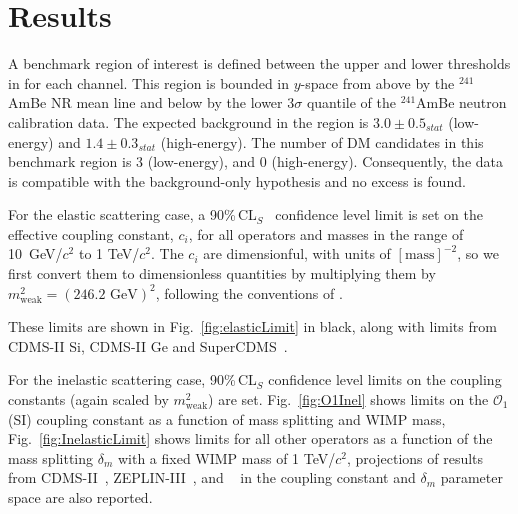 \section{Results}
\label{sec:Results}

A benchmark region of interest is defined between the upper and lower thresholds in \cSi{} for each channel. This region
is bounded in $y$-space from above by the $^{241}$AmBe NR mean line and below by the lower 3$\sigma$ quantile of the $^{241}$AmBe neutron calibration data. The expected background in the region is $3.0 \pm 0.5_{stat}$ (low-energy) and $1.4 \pm 0.3_{stat}$ (high-energy). The number of DM candidates in this benchmark region is 3 (low-energy), and 0 (high-energy). Consequently, the data is compatible with the background-only hypothesis and no excess is found. 

For the elastic scattering case, a 90\%\,CL$_S$~\cite{cls} confidence level limit is set on the effective coupling constant, $c_i$,  for all operators and masses in the range of 10~GeV/$c^2$ to 1 TeV/$c^2$. The $c_i$ are dimensionful, with units of $[\mathrm{mass}]^{-2}$, so we first convert them to dimensionless quantities by multiplying them by $m_\mathrm{weak}^2=(246.2\text{ GeV})^2$, following the conventions of \cite{Anand:MathTools}. 

These limits are shown in Fig.~\ref{fig:elasticLimit} in black, along with limits from CDMS-II Si, CDMS-II Ge and SuperCDMS~\cite{CDMSEFT}.  


For the inelastic scattering case,  90\%\,CL$_S$ confidence level limits on the coupling constants 
(again scaled by $m_\mathrm{weak}^2$) are set. Fig.~\ref{fig:O1Inel} shows limits on the $\mathcal{O}_1$ (SI) coupling constant as a function of mass splitting and WIMP mass, Fig.~\ref{fig:InelasticLimit} shows limits for all other operators as a function of the mass splitting $\delta_m$ with a fixed WIMP mass of 1 TeV/$c^2$,  
projections of results from CDMS-II~\cite{CDMS_Inelastic}, ZEPLIN-III~\cite{Zepplin_Inel}, and \Xehund~\cite{XENON_Inelastic_WIMP} in the coupling constant and $\delta_m$ parameter space are also reported.
  

